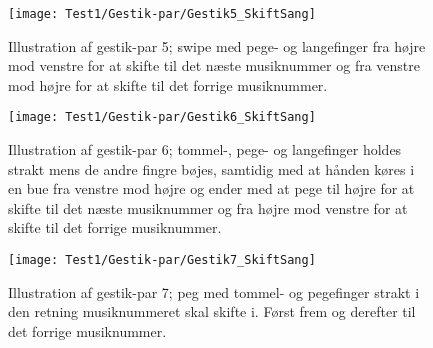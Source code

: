 \noindent
%
%
\begin{figure}[H]
	\centering
	\texttt{[image: Test1/Gestik-par/Gestik5\_SkiftSang]}
	\caption{Illustration af gestik-par 5; swipe med pege- og langefinger fra højre mod venstre for at skifte til det næste musiknummer og fra venstre mod højre for at skifte til det forrige musiknummer.}
	\label{fig:GestikPar5SkiftApp}
\end{figure}
\noindent
%
%
\begin{figure}[H]
	\centering
	\texttt{[image: Test1/Gestik-par/Gestik6\_SkiftSang]}
	\caption{Illustration af gestik-par 6; tommel-, pege- og langefinger holdes strakt mens de andre fingre bøjes, samtidig med at hånden køres i en bue fra venstre mod højre og ender med at pege til højre for at skifte til det næste musiknummer og fra højre mod venstre for at skifte til det forrige musiknummer.}
	\label{fig:GestikPar6SkiftApp}
\end{figure}
\noindent
%
%
\begin{figure}[H]
	\centering
	\texttt{[image: Test1/Gestik-par/Gestik7\_SkiftSang]}
	\caption{Illustration af gestik-par 7; peg med tommel- og pegefinger strakt i den retning musiknummeret skal skifte i. Først frem og derefter til det forrige musiknummer.}
	\label{fig:GestikPar7SkiftApp}
\end{figure}
\noindent
%

